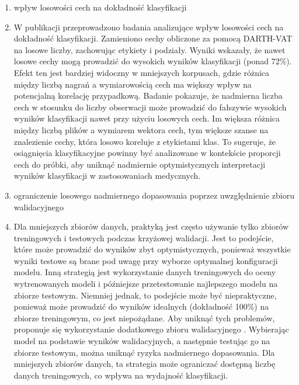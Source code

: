 \begin{enumerate}[label={\alph*)}]
  	\item wpływ losowości cech na dokładność klasyfikacji
	\item[] W publikacji \cite{SustainedVowelsProblems} przeprowadzono badania analizujące wpływ losowości cech na dokładność klasyfikacji.
Zamieniono cechy obliczone za pomocą DARTH-VAT na losowe liczby, zachowując etykiety i podziały.
Wyniki wskazały, że nawet losowe cechy mogą prowadzić do wysokich wyników klasyfikacji (ponad 72\%).
Efekt ten jest bardziej widoczny w mniejszych korpusach, gdzie różnica między liczbą nagrań a wymiarowością cech ma większy wpływ na potencjalną korelację przypadkową.
Badanie pokazuje, że nadmierna liczba cech w stosunku do liczby obserwacji może prowadzić do fałszywie wysokich wyników klasyfikacji nawet przy użyciu losowych cech.
Im większa różnica między liczbą plików a wymiarem wektora cech, tym większe szanse na znalezienie cechy, która losowo koreluje z etykietami klas.
To sugeruje, że osiągnięcia klasyfikacyjne powinny być analizowane w kontekście proporcji cech do próbki, aby uniknąć nadmiernie optymistycznych interpretacji wyników klasyfikacji w zastosowaniach medycznych.

  	\item ograniczenie losowego nadmiernego dopasowania poprzez uwzględnienie zbioru walidacyjnego
	\item[] Dla mniejszych zbiorów danych, praktyką jest często używanie tylko zbiorów treningowych i testowych podczas krzyżowej walidacji.
Jest to podejście, które może prowadzić do wyników zbyt optymistycznych, ponieważ wszystkie wyniki testowe są brane pod uwagę przy wyborze optymalnej
konfiguracji modelu.
Inną strategią jest wykorzystanie danych treningowych do oceny wytrenowanych modeli i późniejsze przetestowanie najlepszego modelu na zbiorze testowym.
Niemniej jednak, to podejście może być niepraktyczne, ponieważ może prowadzić do wyników idealnych (dokładność 100\%) na zbiorze treningowym, co jest niepożądane.
Aby uniknąć tych problemów, proponuje się wykorzystanie dodatkowego zbioru walidacyjnego \cite{SustainedVowelsProblems}.
Wybierając model na podstawie wyników walidacyjnych, a następnie testując go na zbiorze testowym, można uniknąć ryzyka nadmiernego dopasowania.
Dla mniejszych zbiorów danych, ta strategia może ograniczać dostępną liczbę danych treningowych, co wpływa na wydajność klasyfikacji.


\end{enumerate}
